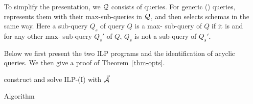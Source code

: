 \vspace{0.36ex}
To simplify the presentation, %
we 
$\mathcal Q$ consists of \SPC queries. For generic \RA (\SQL)
queries,  represents them with their max-\SPC sub-queries
in $\mathcal Q$, %
and then selects schemas in the same way.
Here a sub-query $Q_{s}$ of \RA query $Q$ is a max-\SPC
sub-query of $Q$ if it is  and for any other max-\SPC
sub-query $Q_{s}'$ of $Q$, $Q_{s}$ is not a sub-query of
$Q_{s}'$.


\vspace{0.8ex}
Below we first present the two ILP programs and the identification
of acyclic queries. We then give a proof
of Theorem~\ref{thm-opts}.

\begin{myfloat}[t]
\vspace{1.2ex}
\begin{minipage}{0.50\textwidth}
  \removelatexerror
{\scriptsize
\setlength{\floatsep}{0cm} %
\setlength{\textfloatsep}{-2cm}%
\IncMargin{1em}
\vspace{-0.7ex}
\begin{algorithm}[H]
\Indentp{-2ex}
{}
\Indentp{1em}
\BlankLine
construct and solve ILP-(I) with
$\vec{{\mathcal A}}$\label{opts-l1}
\caption{Algorithm \opts\label{alg-opts}} 
\end{algorithm}
\DecMargin{1em}
}
\end{minipage}
\vspace{-2.4ex}
\end{myfloat}

